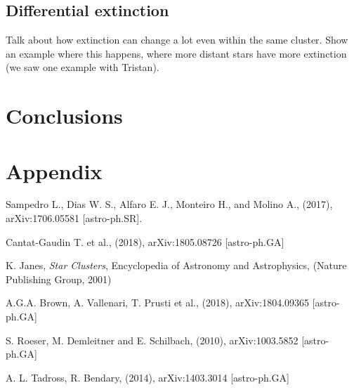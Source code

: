 \documentclass[twocolumn]{revtex4}
\begin{document}
\subsection{Differential extinction}
Talk about how extinction can change a lot even within the same cluster. Show an example where this happens, where more distant stars have more extinction (we saw one example with Tristan).

\section{Conclusions}


\section{Appendix}


\vspace*{0.5cm}
\begin{acknowledgments}

\end{acknowledgments}


\begin{thebibliography}{99}

 Sampedro L., Dias W. S., Alfaro E. J., Monteiro H., and Molino A., (2017), arXiv:1706.05581 [astro-ph.SR].

 Cantat-Gaudin T. et al., (2018), arXiv:1805.08726 [astro-ph.GA]

 K. Janes, \textsl{Star Clusters}, Encyclopedia of Astronomy and Astrophysics, (Nature Publishing Group, 2001)

 A.G.A. Brown, A. Vallenari, T. Prusti et al., (2018), arXiv:1804.09365 [astro-ph.GA]

 S. Roeser, M. Demleitner and E. Schilbach, (2010), arXiv:1003.5852 [astro-ph.GA]

 A. L. Tadross, R. Bendary, (2014), arXiv:1403.3014 [astro-ph.GA]


\end{thebibliography}
\end{document}
